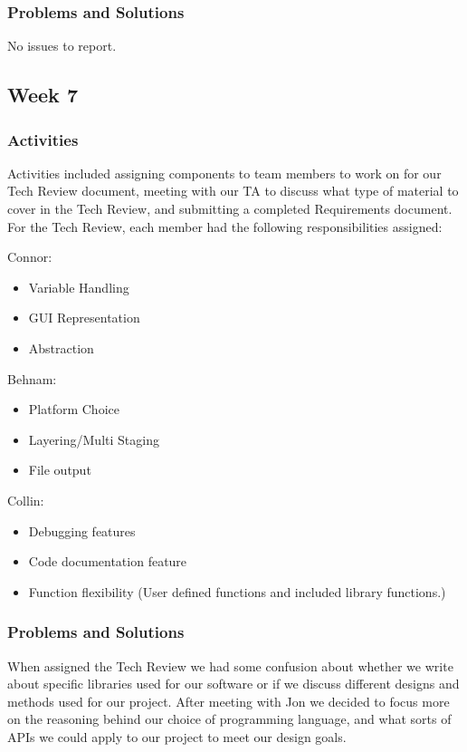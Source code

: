 \documentclass[journal,10pt,onecolumn,compsoc]{IEEEtran} \usepackage[margin=1.0in]{geometry} \usepackage{pdfpages}
\begin{document}
\subsubsection{Problems and Solutions}
No issues to report.
\subsection{Week 7}
\subsubsection{Activities}
Activities included assigning components to team members to work on for our Tech Review document, meeting with our TA to discuss what type of material to cover in the Tech Review, and submitting a completed Requirements document. 
\label{Apportioning}
\noindent For the Tech Review, each member had the following responsibilities assigned:

\noindent Connor:
\begin{itemize}
\item Variable Handling
\item GUI Representation
\item Abstraction
\end{itemize}

\noindent Behnam:
\begin{itemize}
\item Platform Choice
\item Layering/Multi Staging
\item File output
\end{itemize}

\noindent Collin:
\begin{itemize}
\item Debugging features
\item Code documentation feature
\item Function flexibility (User defined functions and included library functions.)
\end{itemize}

\subsubsection{Problems and Solutions}
When assigned the Tech Review we had some confusion about whether we write about specific libraries used for our software or if we discuss different designs and methods used for our project. After meeting with Jon we decided to focus more on the reasoning behind our choice of programming language, and what sorts of APIs we could apply to our project to meet our design goals.
\end{document}
